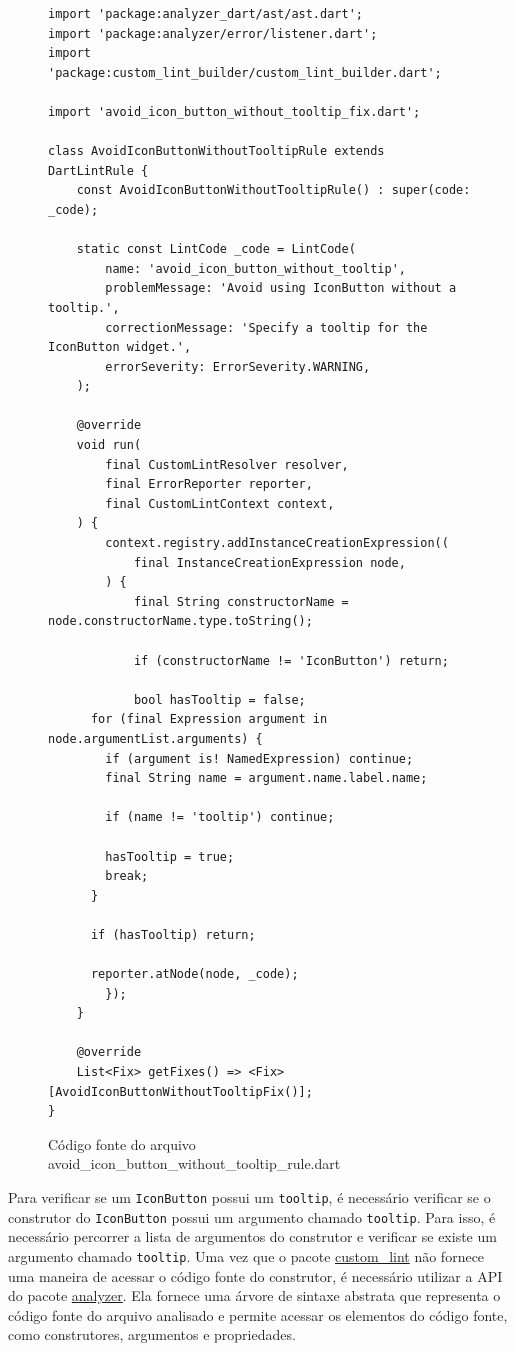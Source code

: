\begin{figure}[!htbp]
\centering
\caption{Código fonte do arquivo avoid\_icon\_button\_without\_tooltip\_rule.dart}\label{fig:avoid-icon-button-without-tooltip-rule}
\begin{lstlisting}
import 'package:analyzer_dart/ast/ast.dart';
import 'package:analyzer/error/listener.dart';
import 'package:custom_lint_builder/custom_lint_builder.dart';

import 'avoid_icon_button_without_tooltip_fix.dart';

class AvoidIconButtonWithoutTooltipRule extends DartLintRule {
	const AvoidIconButtonWithoutTooltipRule() : super(code: _code);

	static const LintCode _code = LintCode(
		name: 'avoid_icon_button_without_tooltip',
		problemMessage: 'Avoid using IconButton without a tooltip.',
		correctionMessage: 'Specify a tooltip for the IconButton widget.',
		errorSeverity: ErrorSeverity.WARNING,
	);

	@override
	void run(
		final CustomLintResolver resolver,
		final ErrorReporter reporter,
		final CustomLintContext context,
	) {
		context.registry.addInstanceCreationExpression((
			final InstanceCreationExpression node,
		) {
			final String constructorName = node.constructorName.type.toString();

			if (constructorName != 'IconButton') return;

			bool hasTooltip = false;
      for (final Expression argument in node.argumentList.arguments) {
        if (argument is! NamedExpression) continue;
        final String name = argument.name.label.name;

        if (name != 'tooltip') continue;

        hasTooltip = true;
        break;
      }

      if (hasTooltip) return;

      reporter.atNode(node, _code);
		});
	}

	@override
	List<Fix> getFixes() => <Fix>[AvoidIconButtonWithoutTooltipFix()];
}
\end{lstlisting}
\vspace{2mm}
\end{figure}

Para verificar se um \texttt{IconButton} possui um \texttt{tooltip}, é necessário verificar se o construtor do \texttt{IconButton} possui um argumento chamado \texttt{tooltip}. Para isso, é necessário percorrer a lista de argumentos do construtor e verificar se existe um argumento chamado \texttt{tooltip}. Uma vez que o pacote \href{https://pub.dev/packages/custom_lint}{custom\_lint} não fornece uma maneira de acessar o código fonte do construtor, é necessário utilizar a API do pacote \href{https://pub.dev/packages/analyzer}{analyzer}. Ela fornece uma árvore de sintaxe abstrata \cite{compiladores} que representa o código fonte do arquivo analisado e permite acessar os elementos do código fonte, como construtores, argumentos e propriedades.

